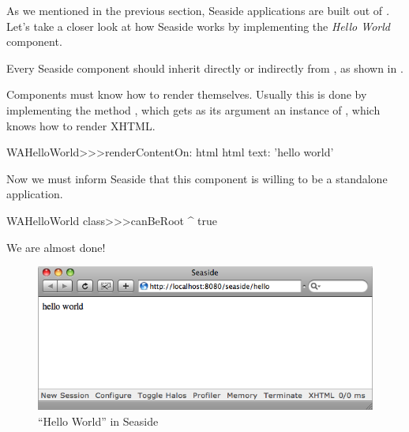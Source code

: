\documentclass[a4paper,10pt,twoside]{book}
\begin{document}
As we mentioned in the previous section, Seaside applications are built out of \emph{.}
Let's take a closer look at how Seaside works by implementing the \emph{Hello World} component.

Every Seaside component should inherit directly or indirectly from , as shown in .


Components must know how to render themselves.
Usually this is done by implementing the method , which gets as its argument an instance of , which knows how to render XHTML.

\begin{code}{}
WAHelloWorld>>>renderContentOn: html
	html text: 'hello world'
\end{code}

\noindent
Now we must inform Seaside that this component is willing to be a standalone application. 


\begin{code}{}
WAHelloWorld class>>>canBeRoot
	^ true
\end{code}

\noindent
We are almost done!


\begin{figure}[htb]
\begin{center}
\includegraphics[width=\textwidth]{WAHelloWorld}
\caption{``Hello World'' in Seaside}
\label{fig:WAHelloWorld}
\end{center}
\end{figure}
\end{document}
